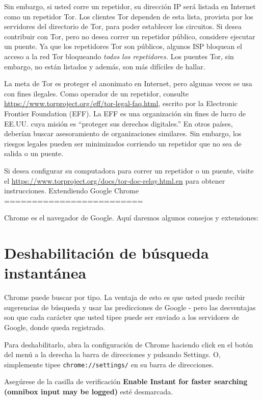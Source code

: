 \documentclass[10pt,a5paper,twoside,,]{book}
\begin{document}
Sin embargo, si usted corre un repetidor, su dirección IP será listada
en Internet como un repetidor Tor. Los clientes Tor dependen de esta
lista, provista por los servidores del directorio de Tor, para poder
establecer los circuitos. Si desea contribuir con Tor, pero no desea
correr un repetidor público, considere ejecutar un puente. Ya que los
repetidores Tor son públicos, algunos ISP bloquean el acceso a la red
Tor bloqueando \emph{todos los repetidores.} Los puentes Tor, sin
embargo, no están listados y además, son más difíciles de hallar.

La meta de Tor es proteger el anonimato en Internet, pero algunas veces
se usa con fines ilegales. Como operador de un repetidor, consulte
\url{https://www.torproject.org/eff/tor-legal-faq.html}, escrito por la
Electronic Frontier Foundation (EFF). La EFF es una organización sin
fines de lucro de EE.UU. cuya misión es ``proteger sus derechos
digitales.'' En otros países, deberían buscar asesoramiento de
organizaciones similares. Sin embargo, los riesgos legales pueden ser
minimizados corriendo un repetidor que no sea de salida o un puente.

Si desea configurar su computadora para correr un repetidor o un puente,
visite el \url{https://www.torproject.org/docs/tor-doc-relay.html.en}
para obtener instrucciones. Extendiendo Google Chrome
=========================

Chrome es el navegador de Google. Aquí daremos algunos consejos y
extensiones:

\section{Deshabilitación de búsqueda
instantánea}\label{deshabilitaciuxf3n-de-buxfasqueda-instantuxe1nea}

Chrome puede buscar por tipo. La ventaja de esto es que usted puede
recibir sugerencias de búsqueda y usar las predicciones de Google - pero
las desventajas son que cada carácter que usted tipee puede ser enviado
a los servidores de Google, donde queda registrado.

Para deshabilitarlo, abra la configuración de Chrome haciendo click en
el botón del menú a la derecha la barra de direcciones y pulsando
Settings. O, simplemente tipee \texttt{chrome://settings/} en su barra
de direcciones.

Asegúrese de la casilla de verificación \textbf{Enable Instant for
faster searching (omnibox input may be logged)} esté desmarcada.
\end{document}
